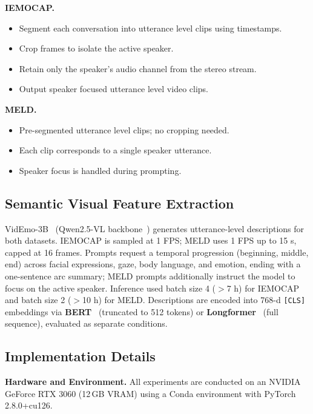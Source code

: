 \documentclass[runningheads]{llncs}
\begin{document}
\noindent\textbf{IEMOCAP.}
\begin{itemize}
  \item Segment each conversation into utterance level clips using timestamps.
  \item Crop frames to isolate the active speaker.
  \item Retain only the speaker's audio channel from the stereo stream.
  \item Output speaker focused utterance level video clips.
\end{itemize}

\smallskip
\noindent\textbf{MELD.}
\begin{itemize}
  \item Pre-segmented utterance level clips; no cropping needed.
  \item Each clip corresponds to a single speaker utterance.
  \item Speaker focus is handled during prompting.
\end{itemize}

\subsection{Semantic Visual Feature Extraction}

VidEmo-3B~\cite{videmo} (Qwen2.5-VL backbone~\cite{qwen2_5_vl}) generates utterance-level descriptions for both datasets. IEMOCAP is sampled at 1 FPS; MELD uses 1 FPS up to 15 s, capped at 16 frames. Prompts request a temporal progression (beginning, middle, end) across facial expressions, gaze, body language, and emotion, ending with a one-sentence arc summary; MELD prompts additionally instruct the model to focus on the active speaker. Inference used batch size 4 ($>$7 h) for IEMOCAP and batch size 2 ($>$10 h) for MELD. Descriptions are encoded into 768-d \texttt{[CLS]} embeddings via \textbf{BERT}~\cite{devlin2019bert} (truncated to 512 tokens) or \textbf{Longformer}~\cite{beltagy2020longformer} (full sequence), evaluated as separate conditions.

\subsection{Implementation Details}

\noindent\textbf{Hardware and Environment.}
All experiments are conducted on an NVIDIA GeForce RTX 3060 (12\,GB VRAM) using a Conda environment with PyTorch 2.8.0+cu126.
\end{document}
